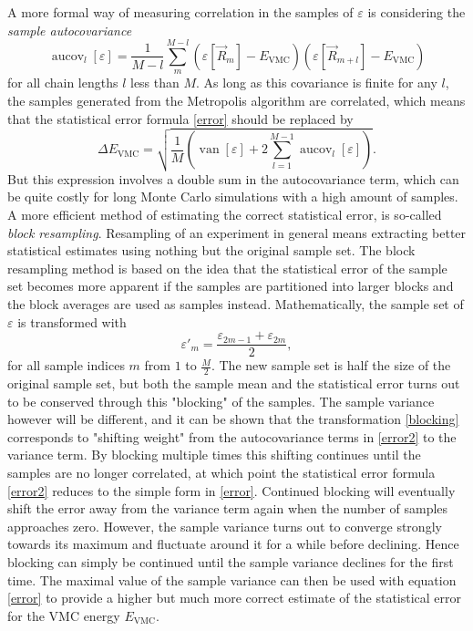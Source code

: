 \documentclass[a4paper,8pt]{article}
\DeclareMathOperator{\van}{van}
\DeclareMathOperator{\aucov}{aucov}
\begin{document}
\begin{multicols}{2}
A more formal way of measuring correlation in the samples of $\varepsilon$ is considering the \textit{sample autocovariance}
\begin{equation}
\aucov_l[\varepsilon] = \frac{1}{M-l}\sum\limits_m^{M-l} \left(\varepsilon[\vec{R}_m]-E_\text{VMC}\right)\left(\varepsilon[\vec{R}_{m+l}]-E_\text{VMC}\right)
\end{equation}
for all chain lengths $l$ less than $M$. As long as this covariance is finite for any $l$, the samples generated from the Metropolis algorithm are correlated, which means that the statistical error formula \eqref{error} should be replaced by
\begin{equation}\label{error2}
\Delta E_\text{VMC} = \sqrt{\frac{1}{M} \left(\van[\varepsilon]+2\sum\limits_{l=1}^{M-1} \aucov_l[\varepsilon]\right)}.
\end{equation}
But this expression involves a double sum in the autocovariance term, which can be quite costly for long Monte Carlo simulations with a high amount of samples. A more efficient method of estimating the correct statistical error, is so-called \textit{block resampling}. Resampling of an experiment in general means extracting better statistical estimates using nothing but the original sample set. The block resampling method is based on the idea that the statistical error of the sample set becomes more apparent if the samples are partitioned into larger blocks and the block averages are used as samples instead. Mathematically, the sample set of $\varepsilon$ is transformed with
\begin{equation}\label{blocking}
\varepsilon'_m = \frac{\varepsilon_{2m-1}+\varepsilon_{2m}}{2},
\end{equation}
for all sample indices $m$ from $1$ to $\frac{M}{2}$. The new sample set is half the size of the original sample set, but both the sample mean and the statistical error turns out to be conserved through this "blocking" of the samples. The sample variance however will be different, and it can be shown that the transformation \eqref{blocking} corresponds to "shifting weight" from the autocovariance terms in \eqref{error2} to the variance term. By blocking multiple times this shifting continues until the samples are no longer correlated, at which point the statistical error formula \eqref{error2} reduces to the simple form in \eqref{error}. Continued blocking will eventually shift the error away from the variance term again when the number of samples approaches zero. However, the sample variance turns out to converge strongly towards its maximum and fluctuate around it for a while before declining. Hence blocking can simply be continued until the sample variance declines for the first time. The maximal value of the sample variance can then be used with equation \eqref{error} to provide a higher but much more correct estimate of the statistical error for the VMC energy $E_\text{VMC}$.




\end{multicols}
\end{document}
